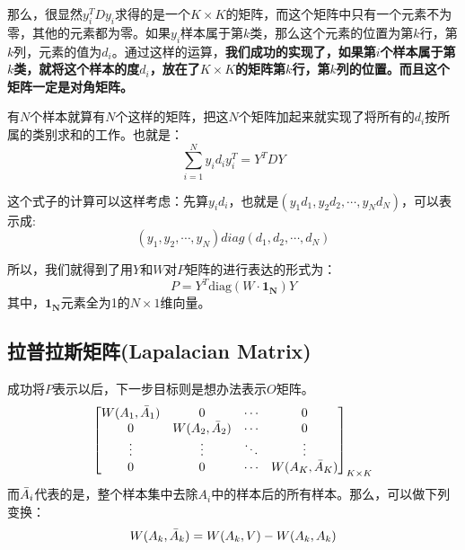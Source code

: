 \documentclass[a4paper]{article}
\begin{document}
那么，很显然$y_i^T D y_i$求得的是一个$K\times K$的矩阵，而这个矩阵中只有一个元素不为零，其他的元素都为零。如果$y_i$样本属于第$k$类，那么这个元素的位置为第$k$行，第$k$列，元素的值为$d_i$。通过这样的运算，\textbf{我们成功的实现了，如果第$i$个样本属于第$k$类，就将这个样本的度$d_i$，放在了$K \times K$的矩阵第$k$行，第$k$列的位置。而且这个矩阵一定是对角矩阵。}

有$N$个样本就算有$N$个这样的矩阵，把这$N$个矩阵加起来就实现了将所有的$d_i$按所属的类别求和的工作。也就是：
\begin{equation}
    \sum_{i=1}^N y_i d_{i} y_i^T = Y^TDY 
\end{equation}

这个式子的计算可以这样考虑：先算$y_i d_i$，也就是$(y_1d_1,y_2d_2,\cdots,y_Nd_N)$，可以表示成:
\begin{equation}
    (y_1,y_2,\cdots,y_N)diag(d_1,d_2,\cdots,d_N)
\end{equation}


所以，我们就得到了用$Y$和$W$对$P$矩阵的进行表达的形式为：
\begin{equation}
    P = Y^T\mathrm{diag}(W\cdot \mathbf{1_N})Y
\end{equation}
其中，$\mathbf{1_N}$元素全为1的$N\times1$维向量。

\subsection{拉普拉斯矩阵(Lapalacian Matrix)}
成功将$P$表示以后，下一步目标则是想办法表示$O$矩阵。
\begin{equation}
    \begin{bmatrix}
    { W(A_1,\Bar{A}_1)} & 0 & \cdots & 0 \\
    0 &  W(A_2,\Bar{A}_2) &   \cdots & 0 \\
    \vdots & \vdots & \ddots & \vdots \\
    0 & 0  &   \cdots & { W(A_K,\Bar{A}_K)} \\
    \end{bmatrix}_{K\times K}
\end{equation}
而$\Bar{A}_i$代表的是，整个样本集中去除$A_i$中的样本后的所有样本。那么，可以做下列变换：
\begin{equation}
    W(A_k,\Bar{A}_k) = W(A_k,V) - W(A_k,A_k)
\end{equation}
\end{document}
